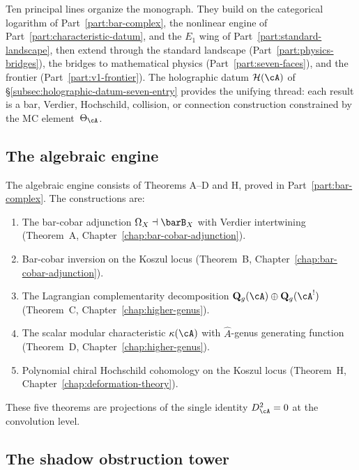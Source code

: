 Ten principal lines organize the monograph. They build on the
categorical logarithm of Part~\ref{part:bar-complex}, the nonlinear
engine of Part~\ref{part:characteristic-datum}, and the $E_1$ wing of
Part~\ref{part:standard-landscape}, then extend through the standard
landscape (Part~\ref{part:physics-bridges}), the bridges to
mathematical physics (Part~\ref{part:seven-faces}), and the frontier
(Part~\ref{part:v1-frontier}). The
holographic datum $\mathcal{H}(\cA)$ of
\S\ref{subsec:holographic-datum-seven-entry} provides the unifying thread:
each result is a bar, Verdier, Hochschild, collision, or connection
construction constrained by the MC element~$\Theta_\cA$.

\subsection{The algebraic engine}
\label{subsec:thqg-intro-guide-engine}

The algebraic engine consists of Theorems A--D and H, proved in
Part~\ref{part:bar-complex}. The constructions are:
\begin{enumerate}[label=\textup{(\roman*)}]
\item The bar-cobar adjunction $\Omega_X \dashv \barB_X$ with
 Verdier intertwining (Theorem~A,
 Chapter~\ref{chap:bar-cobar-adjunction}).
\item Bar-cobar inversion on the Koszul locus (Theorem~B,
 Chapter~\ref{chap:bar-cobar-adjunction}).
\item The Lagrangian complementarity decomposition
 $\mathbf{Q}_g(\cA) \oplus \mathbf{Q}_g(\cA^!)$
 (Theorem~C, Chapter~\ref{chap:higher-genus}).
\item The scalar modular characteristic $\kappa(\cA)$ with
 $\hat{A}$-genus generating function (Theorem~D,
 Chapter~\ref{chap:higher-genus}).
\item Polynomial chiral Hochschild cohomology on the Koszul locus
 (Theorem~H, Chapter~\ref{chap:deformation-theory}).
\end{enumerate}
These five theorems are projections of the single identity
$D_\cA^2 = 0$ at the convolution level.

\subsection{The shadow obstruction tower}
\label{subsec:thqg-intro-guide-shadow}

